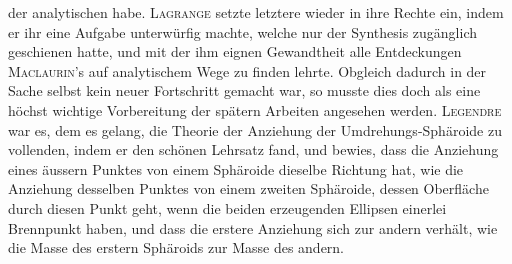 der analytischen habe. \textsc{Lagrange} setzte letztere wieder in ihre Rechte ein, indem er ihr eine Aufgabe unterwürfig machte, welche nur der Synthesis zugänglich geschienen hatte, und mit der ihm eignen Gewandtheit alle Entdeckungen \textsc{Maclaurin}'s auf analytischem Wege zu finden lehrte. Obgleich dadurch in der Sache selbst kein neuer Fortschritt gemacht war, so musste dies doch als eine höchst wichtige Vorbereitung der spätern Arbeiten angesehen werden. \textsc{Legendre} war es, dem es gelang, die Theorie der Anziehung der Umdrehungs-Sphäroide zu vollenden, indem er den schönen Lehrsatz fand, und bewies, dass die Anziehung eines äussern Punktes von einem Sphäroide dieselbe Richtung hat, wie die Anziehung desselben Punktes von einem zweiten Sphäroide, dessen Oberfläche durch diesen Punkt geht, wenn die beiden erzeugenden Ellipsen einerlei Brennpunkt haben, und dass die erstere Anziehung sich zur andern verhält, wie die Masse des erstern Sphäroids zur Masse des andern.

